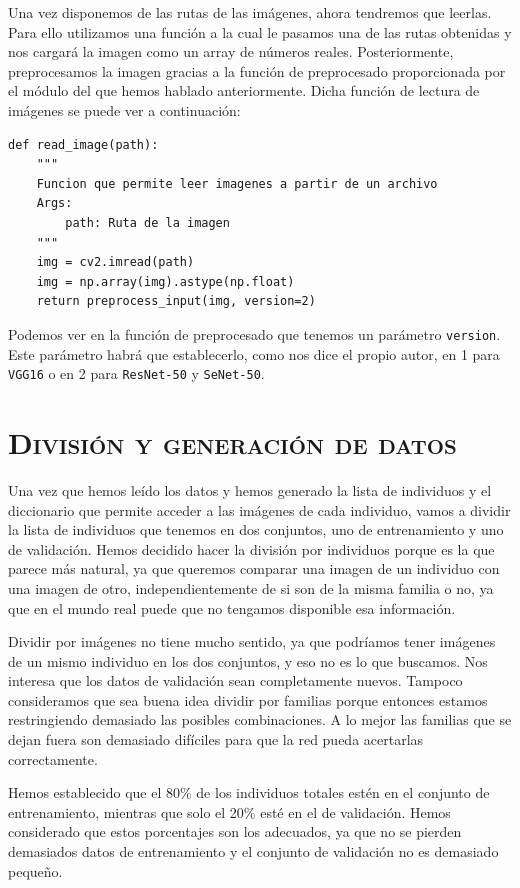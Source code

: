 \documentclass[11pt,a4paper]{article}
\begin{document}
Una vez disponemos de las rutas de las imágenes, ahora tendremos que leerlas. Para ello utilizamos una función a
la cual le pasamos una de las rutas obtenidas y nos cargará la imagen como un array de números reales.
Posteriormente, preprocesamos la imagen gracias a la función de preprocesado proporcionada por el módulo
del que hemos hablado anteriormente. Dicha función de lectura de imágenes se puede ver a continuación:

\begin{lstlisting}
def read_image(path):
    """
    Funcion que permite leer imagenes a partir de un archivo
    Args:
        path: Ruta de la imagen
    """
    img = cv2.imread(path)
    img = np.array(img).astype(np.float)
    return preprocess_input(img, version=2)
\end{lstlisting}

Podemos ver en la función de preprocesado que tenemos un parámetro \texttt{version}. Este parámetro habrá que
establecerlo, como nos dice el propio autor, en 1 para \texttt{VGG16} o en 2 para \texttt{ResNet-50} y
\texttt{SeNet-50}.

\section{\textsc{División y generación de datos}}

Una vez que hemos leído los datos y hemos generado la lista de individuos y el diccionario
que permite acceder a las imágenes de cada individuo, vamos a dividir la lista de individuos
que tenemos en dos conjuntos, uno de entrenamiento y uno de validación. Hemos decidido hacer
la división por individuos porque es la que parece más natural, ya que queremos comparar una
imagen de un individuo con una imagen de otro, independientemente de si son de la misma familia
o no, ya que en el mundo real puede que no tengamos disponible esa información.

Dividir por imágenes no tiene mucho sentido, ya que podríamos tener imágenes de un mismo individuo
en los dos conjuntos, y eso no es lo que buscamos. Nos interesa que los datos de validación sean
completamente nuevos. Tampoco consideramos que sea buena idea dividir por familias porque entonces
estamos restringiendo demasiado las posibles combinaciones. A lo mejor las familias que se dejan
fuera son demasiado difíciles para que la red pueda acertarlas correctamente.

Hemos establecido que el 80\% de los individuos totales estén en el conjunto de entrenamiento, mientras
que solo el 20\% esté en el de validación. Hemos considerado que estos porcentajes son los adecuados,
ya que no se pierden demasiados datos de entrenamiento y el conjunto de validación no es demasiado
pequeño.
\end{document}

